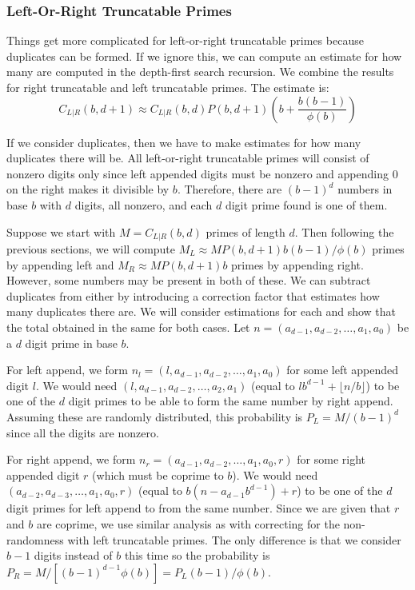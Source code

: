 \documentclass[12pt]{article}
\begin{document}
\subsubsection{Left-Or-Right Truncatable Primes}

Things get more complicated for left-or-right truncatable primes because duplicates can be formed. If we ignore this, we can compute an estimate for how many are computed in the depth-first search recursion. We combine the results for right truncatable and left truncatable primes. The estimate is:
\begin{equation}
C_{L|R}(b,d+1) \approx C_{L|R}(b,d)P(b,d+1)\left(b+\frac{b(b-1)}{\phi(b)}\right)
\end{equation}

If we consider duplicates, then we have to make estimates for how many duplicates there will be. All left-or-right truncatable primes will consist of nonzero digits only since left appended digits must be nonzero and appending 0 on the right makes it divisible by $b$. Therefore, there are $(b-1)^d$ numbers in base $b$ with $d$ digits, all nonzero, and each $d$ digit prime found is one of them.

Suppose we start with $M=C_{L|R}(b,d)$ primes of length $d$. Then following the previous sections, we will compute $M_L \approx MP(b,d+1)b(b-1)/\phi(b)$ primes by appending left and $M_R \approx MP(b,d+1)b$ primes by appending right. However, some numbers may be present in both of these. We can subtract duplicates from either by introducing a correction factor that estimates how many duplicates there are. We will consider estimations for each and show that the total obtained in the same for both cases. Let $n=(a_{d-1},a_{d-2},\dots,a_1,a_0)$ be a $d$ digit prime in base $b$.

For left append, we form $n_l=(l,a_{d-1},a_{d-2},\ldots,a_1,a_0)$ for some left appended digit $l$. We would need $(l,a_{d-1},a_{d-2},\ldots,a_2,a_1)$ (equal to $lb^{d-1}+\lfloor n/b\rfloor$) to be one of the $d$ digit primes to be able to form the same number by right append. Assuming these are randomly distributed, this probability is $P_L=M/(b-1)^d$ since all the digits are nonzero.

For right append, we form $n_r=(a_{d-1},a_{d-2},\ldots,a_1,a_0,r)$ for some right appended digit $r$ (which must be coprime to $b$). We would need $(a_{d-2},a_{d-3},\ldots,a_1,a_0,r)$ (equal to $b(n-a_{d-1}b^{d-1})+r$) to be one of the $d$ digit primes for left append to from the same number. Since we are given that $r$ and $b$ are coprime, we use similar analysis as with correcting for the non-randomness with left truncatable primes. The only difference is that we consider $b-1$ digits instead of $b$ this time so the probability is $P_R=M/[(b-1)^{d-1}\phi(b)]=P_L(b-1)/\phi(b)$.
\end{document}
